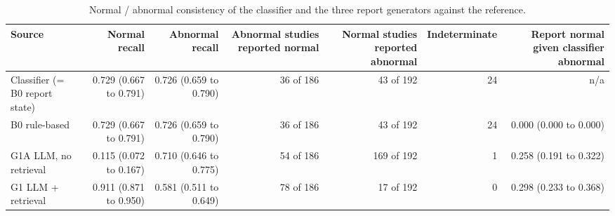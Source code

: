 \begin{table}[t]
\centering
\scriptsize
\begin{tabular}{lrrrrrr}
\hline
Source & Normal recall & Abnormal recall & Abnormal studies reported normal & Normal studies reported abnormal & Indeterminate & Report normal given classifier abnormal \\
\hline
Classifier (= B0 report state) & 0.729 (0.667 to 0.791) & 0.726 (0.659 to 0.790) & 36 of 186 & 43 of 192 & 24 & n/a \\
B0 rule-based & 0.729 (0.667 to 0.791) & 0.726 (0.659 to 0.790) & 36 of 186 & 43 of 192 & 24 & 0.000 (0.000 to 0.000) \\
G1A LLM, no retrieval & 0.115 (0.072 to 0.167) & 0.710 (0.646 to 0.775) & 54 of 186 & 169 of 192 & 1 & 0.258 (0.191 to 0.322) \\
G1 LLM + retrieval & 0.911 (0.871 to 0.950) & 0.581 (0.511 to 0.649) & 78 of 186 & 17 of 192 & 0 & 0.298 (0.233 to 0.368) \\
\hline
\end{tabular}
\caption{Normal / abnormal consistency of the classifier and the three report generators against the reference.}
\label{tab:table5_normal_abnormal_analysis}
\end{table}

